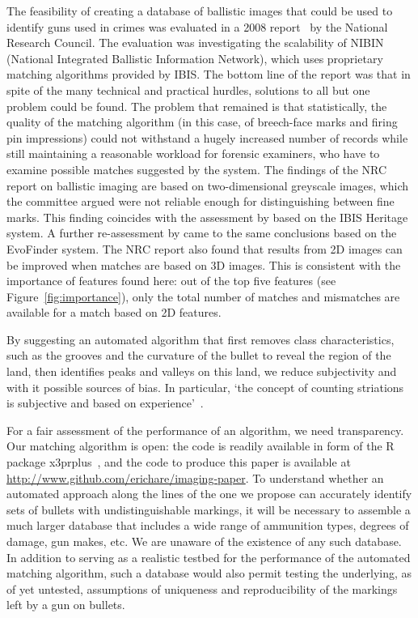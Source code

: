 \documentclass[aoas, preprint]{imsart}\usepackage[]{graphicx}\usepackage[]{color}
\begin{document}
The feasibility of creating a database of ballistic images that could be used to identify guns used in crimes was evaluated in a 2008 report~\citep{nap:2008} by the National Research Council. The evaluation was investigating the scalability of NIBIN (National Integrated Ballistic Information Network), which uses proprietary matching algorithms provided by IBIS. The bottom line of the report was that in spite of the many technical and practical hurdles, solutions to all but one problem could be found. The problem that remained is that statistically, the quality of the matching algorithm (in this case, of breech-face marks and firing pin impressions) could not withstand a hugely increased number of records while still maintaining a reasonable workload for forensic examiners, who have to examine possible matches suggested by the system. 
The findings of the NRC report on ballistic imaging are based on two-dimensional greyscale images, which the committee argued were not reliable enough for distinguishing between fine marks. This finding coincides with the assessment by \citet{dekinder:2004} based on the IBIS Heritage system. A further re-assessment by \citet{deceuster:2015} came to the same conclusions based on the EvoFinder system. 
The NRC report also found that results from 2D images can be improved when matches are based on 3D images. This is consistent with the importance of features found here: out of the top five features (see Figure~\ref{fig:importance}), only the total number of matches and mismatches are available for a match based on 2D features.

By suggesting an automated algorithm that first removes class characteristics, such as the grooves and the curvature of the bullet to reveal the region of the  land, then identifies peaks and valleys on this land, we reduce subjectivity and with it possible sources of bias. In particular, `the concept of counting striations is subjective and based on experience'~\citep{miller:1998}.

For a fair assessment of the performance of an algorithm, we need transparency. Our matching  algorithm is open: the code is readily available in form of the R package x3prplus~\citep{x3prplus}, and the code to produce this paper is available at \url{http://www.github.com/erichare/imaging-paper}. To understand whether an automated approach along the lines of the one we propose can accurately identify sets of bullets with undistinguishable markings, it will be necessary to assemble a much larger database that includes a wide range of ammunition types, degrees of damage, gun makes, etc. We are unaware of the existence of any such database. In addition to serving as a realistic testbed for the performance of the automated matching algorithm, such a database would also permit testing the underlying, as of yet untested, assumptions of uniqueness and reproducibility of the markings left by a gun on bullets.
\end{document}
